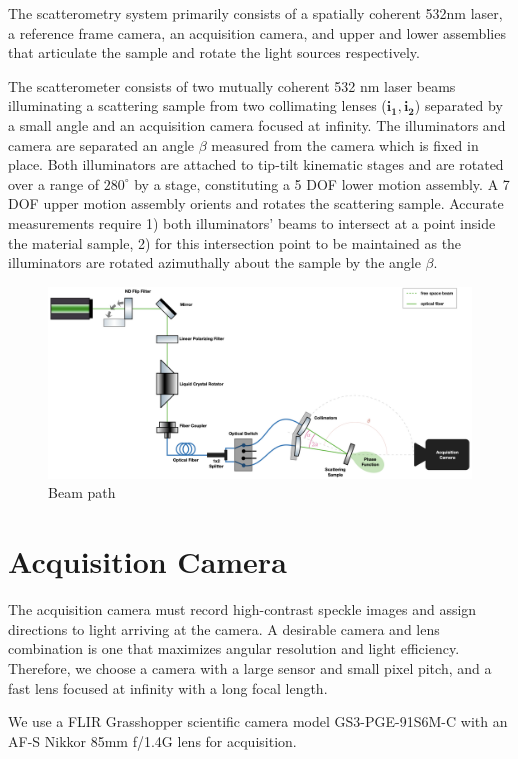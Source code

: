 
The scatterometry system primarily consists of a spatially coherent 532nm laser, a reference frame camera, an acquisition camera, and upper and lower assemblies that articulate the sample and rotate the light sources respectively.

The scatterometer consists of two mutually coherent 532 nm laser beams illuminating a scattering sample from two collimating lenses ($\mathbf{i_1, i_2}$) separated by a small angle and an acquisition camera focused at infinity. The illuminators and camera are separated an angle $\beta$ measured from the camera which is fixed in place. Both illuminators are attached to tip-tilt kinematic stages and are rotated over a range of $280^\circ$ by a stage, constituting a 5 DOF lower motion assembly. A 7 DOF upper motion assembly orients and rotates the scattering sample. Accurate measurements require 1) both illuminators' beams to intersect at a point inside the material sample, 2) for this intersection point to be maintained as the illuminators are rotated azimuthally about the sample by the angle $\beta$.

\begin{figure}
    \centering
    \includegraphics[width=0.75\linewidth]{figures/laser_path.png}
    \caption{Beam path}
    \label{fig:beam_path}
\end{figure}

\section{Acquisition Camera}
The acquisition camera must record high-contrast speckle images and assign directions to light arriving at the camera. A desirable camera and lens combination is one that maximizes angular resolution and light efficiency. Therefore, we choose a camera with a large sensor and small pixel pitch, and a fast lens focused at infinity with a long focal length.

We use a FLIR Grasshopper scientific camera model GS3-PGE-91S6M-C with an AF-S Nikkor 85mm f/1.4G lens for acquisition.

